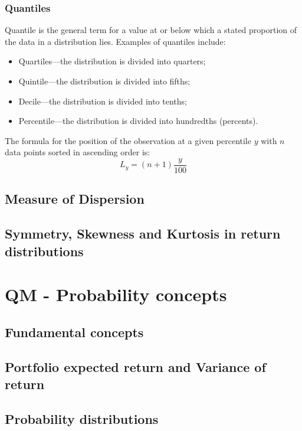 \subsubsection{Quantiles}
Quantile is the general term for a value at or below which a stated proportion of the data in a distribution lies. Examples of quantiles include:
\begin{itemize}
	\setlength\itemsep{0em}
	\item Quartiles—the distribution is divided into quarters;
	\item Quintile—the distribution is divided into fifths;
	\item Decile—the distribution is divided into tenths;
	\item Percentile—the distribution is divided into hundredths (percents).
\end{itemize}
The formula for the position of the observation at a given percentile $y$ with $n$ data points sorted in ascending order is:
\begin{equation}
	L_y = (n+1) \frac{y}{100}
\end{equation}


\subsection{Measure of Dispersion}



\subsection{Symmetry, Skewness and Kurtosis in return distributions}



\section{QM - Probability concepts}

\subsection{Fundamental concepts}

\subsection{Portfolio expected return and Variance of return}

\subsection{Probability distributions}


